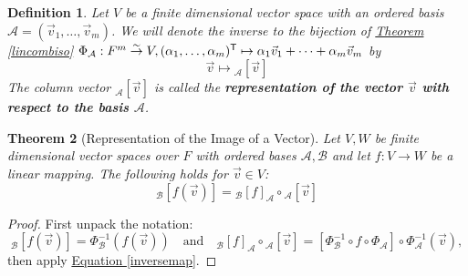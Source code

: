 \documentclass[11pt]{amsbook}
\newtheorem{theorem}{Theorem}[section]
\newtheorem{definition}[theorem]{Definition}
\theoremstyle{definition}
\begin{document}
\begin{definition}
Let $V$ be a finite dimensional vector space with an ordered basis $\mathcal{A} = (\vec{v}_1, \ldots , \vec{v}_m)$. We will denote the inverse to the bijection of \hyperref[lincombiso]{Theorem \ref{lincombiso}} $\Phi_{\mathcal{A}}: F^m \stackrel{\sim}{\to} V, (\alpha_1, \ldots ,\alpha_m)^{\sf T} \mapsto \alpha_1\vec{v}_1+\cdots + \alpha_m\vec{v}_m$ by $$\vec{v} \mapsto {}_{\mathcal{A}}[\vec{v}]$$ The column vector ${}_{\mathcal{A}}[\vec{v}]$ is called the {\bf representation of the vector $\vec{v}$ with respect to the basis $\mathcal{A}$}.
\end{definition}

\begin{theorem}[Representation of the Image of a Vector]\label{rep} Let $V,W$ be finite dimensional vector spaces over $F$ with ordered bases $\mathcal{A}, \mathcal{B}$ and let $f: V\to W$ be a linear mapping. The following holds for $\vec{v}\in V$:$${}_\mathcal{B}[f(\vec{v})] = {}_\mathcal{B}[f]_{\mathcal{A}} \circ {}_{\mathcal{A}}[\vec{v}]$$
\end{theorem}

\begin{proof}
First unpack the notation: $${}_\mathcal{B}[f(\vec{v})] = \Phi_{\mathcal{B}}^{-1} (f (\vec{v})) \quad \text{and} \quad {}_\mathcal{B}[f]_{\mathcal{A}} \circ {}_{\mathcal{A}}[\vec{v}] = [\Phi_\mathcal{B}^{-1}\circ f \circ \Phi_{\mathcal{A}}] \circ \Phi_\mathcal{A}^{-1} (\vec{v}),$$ then apply \hyperref[inversemap]{Equation \eqref{inversemap}}.
\end{proof}
\end{document}
